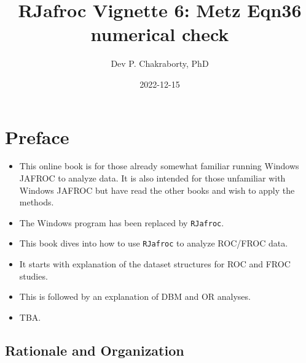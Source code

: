 \documentclass[
]{book}
\title{RJafroc Vignette 6: Metz Eqn36 numerical check}
\author{Dev P. Chakraborty, PhD}
\date{2022-12-15}
\providecommand{\tightlist}{%
  \setlength{\itemsep}{0pt}\setlength{\parskip}{0pt}}
\begin{document}
\maketitle

{
\setcounter{tocdepth}{1}
\tableofcontents
}
\hypertarget{quick-start-index-preface}{%
\chapter{Preface}\label{quick-start-index-preface}}

\begin{itemize}
\tightlist
\item
  This online book is for those already somewhat familiar running Windows JAFROC to analyze data. It is also intended for those unfamiliar with Windows JAFROC but have read the other books and wish to apply the methods.
\item
  The Windows program has been replaced by \texttt{RJafroc}.
\item
  This book dives into how to use \texttt{RJafroc} to analyze ROC/FROC data.
\item
  It starts with explanation of the dataset structures for ROC and FROC studies.
\item
  This is followed by an explanation of DBM and OR analyses.
\item
  TBA.
\end{itemize}

\hypertarget{quick-start-index-rationale-and-organization}{%
\section{Rationale and Organization}\label{quick-start-index-rationale-and-organization}}
\end{document}
